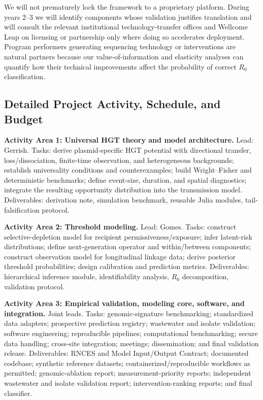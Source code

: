 \documentclass[12pt,a4paper]{article}
\begin{document}
We will not prematurely lock the framework to a proprietary platform. During years 2--3 we will identify components whose validation justifies translation and will consult the relevant institutional technology-transfer offices and Wellcome Leap on licensing or partnership only where doing so accelerates deployment. Program performers generating sequencing technology or interventions are natural partners because our value-of-information and elasticity analyses can quantify how their technical improvements affect the probability of correct $R_0$ classification.

\subsection*{Detailed Project Activity, Schedule, and Budget}

\textbf{Activity Area 1: Universal HGT theory and model architecture.} Lead: Gerrish. Tasks: derive plasmid-specific HGT potential with directional transfer, loss/dissociation, finite-time observation, and heterogeneous backgrounds; establish universality conditions and counterexamples; build Wright--Fisher and deterministic benchmarks; define event-size, duration, and spatial diagnostics; integrate the resulting opportunity distribution into the transmission model. Deliverables: derivation note, simulation benchmark, reusable Julia modules, tail-falsification protocol.

\textbf{Activity Area 2: Threshold modeling.} Lead: Gomes. Tasks: construct selective-depletion model for recipient permissiveness/exposure; infer latent-risk distributions; define next-generation operator and within/between components; construct observation model for longitudinal linkage data; derive posterior threshold probabilities; design calibration and prediction metrics. Deliverables: hierarchical inference module, identifiability analysis, $R_0$ decomposition, validation protocol.

\textbf{Activity Area 3: Empirical validation, modeling core, software, and integration.} Joint leads. Tasks: genomic-signature benchmarking; standardized data adapters; prospective prediction registry; wastewater and isolate validation; software engineering; reproducible pipelines; computational benchmarking; secure data handling; cross-site integration; meetings; dissemination; and final validation release. Deliverables: RNCES and Model Input/Output Contract; documented codebase; synthetic reference datasets; containerized/reproducible workflows as permitted; genomic-ablation report; measurement-priority reports; independent wastewater and isolate validation report; intervention-ranking reports; and final classifier.
\end{document}
